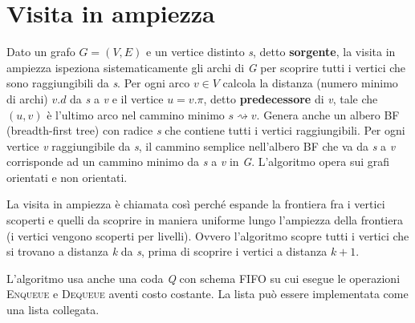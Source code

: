 \documentclass[10pt, a4paper]{report}
\begin{document}
\section{Visita in ampiezza}
Dato un grafo $G = (V,E)$ e un vertice distinto \textit{s}, detto \textbf{sorgente}, la visita in ampiezza ispeziona sistematicamente gli archi di \textit{G} per scoprire tutti i vertici che sono raggiungibili da \textit{s}. Per ogni arco $v \in V$ calcola la distanza (numero minimo di archi) $v.d$ da \textit{s} a \textit{v} e il vertice $u = v.\pi$, detto \textbf{predecessore} di \textit{v}, tale che $(u,v)$ è l'ultimo arco nel cammino minimo $s \rightsquigarrow v$. Genera anche un albero BF (breadth-first tree) con radice \textit{s} che contiene tutti i vertici raggiungibili. Per ogni vertice \textit{v} raggiungibile da \textit{s}, il cammino semplice nell'albero BF che va da \textit{s} a \textit{v} corrisponde ad un cammino minimo da \textit{s} a \textit{v} in \textit{G}. L'algoritmo opera sui grafi orientati e non orientati.

La visita in ampiezza è chiamata così perché espande la frontiera fra i vertici scoperti e quelli da scoprire in maniera uniforme lungo l'ampiezza della frontiera (i vertici vengono scoperti per livelli). Ovvero l'algoritmo scopre tutti i vertici che si trovano a distanza \textit{k} da \textit{s}, prima di scoprire i vertici a distanza $k + 1$.

L'algoritmo usa anche una coda \textit{Q} con schema \textsc{FIFO} su cui esegue le operazioni \textsc{Enqueue} e \textsc{Dequeue} aventi costo costante. La lista può essere implementata come una lista collegata.
\end{document}
